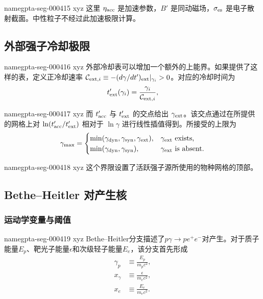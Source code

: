 \documentclass[twocolumn]{aastex702}
\makeatletter
\providecommand{\gptareaderanchor}[1]{\pdfdest name{#1} xyz}%
\providecommand{\gptareaderanchor}[1]{\special{pdf:dest (#1) [ @thispage /XYZ @xpos @ypos null ]}}%
\makeatother
\begin{document}
\gptareaderanchor{gpta-seg-000415}%
这里 \(\eta_{\rm acc}\) 是加速参数，\(B'\) 是同动磁场，\(\sigma_{\rm es}\) 是电子散射截面。中性粒子不经过此加速极限计算。

\subsection{外部强子冷却极限}


\gptareaderanchor{gpta-seg-000416}%
外部冷却表可以增加一个额外的上能界。如果提供了这样的表，定义正冷却速率 \(\mathcal{C}_{{\rm ext},i}\equiv -(d\gamma/dt')_{\rm ext}|_{\gamma_i}>0\)。对应的冷却时间为
\begin{equation}
\begin{aligned}
t'_{\rm ext}(\gamma_i)=\frac{\gamma_i}{\mathcal{C}_{{\rm ext},i}},
\end{aligned}
\end{equation}

\gptareaderanchor{gpta-seg-000417}%
而 \(t'_{\rm acc}\) 与 \(t'_{\rm ext}\) 的交点给出 \(\gamma_{\rm ext}\)。该交点通过在所提供的网格上对 \(\ln(t'_{\rm acc}/t'_{\rm ext})\) 相对于 \(\ln\gamma\) 进行线性插值得到。所接受的上限为
\begin{equation}
\begin{aligned}
\gamma_{\max}=
\begin{cases}
\min(\gamma_{\rm dyn},\gamma_{\rm syn},\gamma_{\rm ext}),&
\gamma_{\rm ext}\ {\rm exists},\\
\min(\gamma_{\rm dyn},\gamma_{\rm syn}),&
\gamma_{\rm ext}\ {\rm is\ absent}.
\end{cases}
\end{aligned}
\end{equation}

\gptareaderanchor{gpta-seg-000418}%
这个界限设置了活跃强子源所使用的物种网格的顶部。

\subsection{Bethe--Heitler 对产生核}

\subsubsection{运动学变量与阈值}


\gptareaderanchor{gpta-seg-000419}%
Bethe–Heitler分支描述了\(p\gamma\to pe^+e^-\)对产生。对于质子能量\(E_p\)、靶光子能量\(\epsilon\)和次级轻子能量\(E_e\)，该分支首先形成
\begin{equation}
\begin{aligned}
\gamma_p&\equiv \frac{E_p}{m_pc^2},\\
x_\gamma&\equiv \frac{\epsilon}{m_ec^2},\\
x_e&\equiv \frac{E_e}{m_ec^2}.
\end{aligned}
\end{equation}
\end{document}
